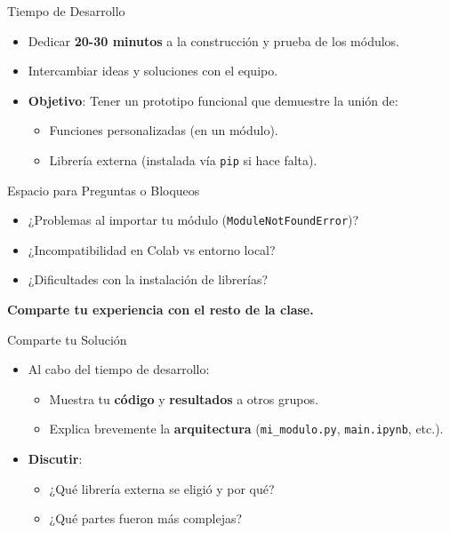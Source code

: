 \documentclass[10pt]{beamer}
\begin{document}
\begin{frame}{Tiempo de Desarrollo}
  \begin{itemize}
    \item Dedicar \textbf{20-30 minutos} a la construcción y prueba de los módulos.
    \item Intercambiar ideas y soluciones con el equipo.
    \item \textbf{Objetivo}: Tener un prototipo funcional que demuestre la unión de:
      \begin{itemize}
        \item Funciones personalizadas (en un módulo).
        \item Librería externa (instalada vía \texttt{pip} si hace falta).
      \end{itemize}
  \end{itemize}
\end{frame}

\begin{frame}{Espacio para Preguntas o Bloqueos}
  \begin{itemize}
    \item ¿Problemas al importar tu módulo (\texttt{ModuleNotFoundError})?
    \item ¿Incompatibilidad en Colab vs entorno local?
    \item ¿Dificultades con la instalación de librerías?
  \end{itemize}
  \vspace{0.2cm}
  \textbf{Comparte tu experiencia con el resto de la clase.}
\end{frame}

\begin{frame}{Comparte tu Solución}
  \begin{itemize}
    \item Al cabo del tiempo de desarrollo:
      \begin{itemize}
        \item Muestra tu \textbf{código} y \textbf{resultados} a otros grupos.
        \item Explica brevemente la \textbf{arquitectura} (\texttt{mi\_modulo.py}, \texttt{main.ipynb}, etc.).
      \end{itemize}
    \item \textbf{Discutir}:
      \begin{itemize}
        \item ¿Qué librería externa se eligió y por qué?
        \item ¿Qué partes fueron más complejas?
      \end{itemize}
  \end{itemize}
\end{frame}
\end{document}
